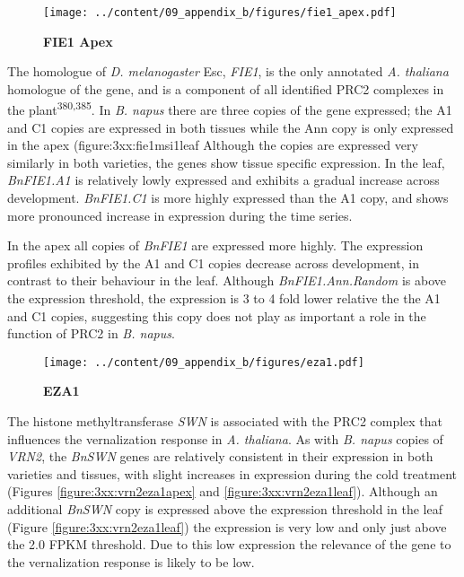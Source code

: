 \documentclass[12pt,]{book}
\begin{document}
\begin{figure}[htbp]
\centering
\texttt{[image: ../content/09\_appendix\_b/figures/fie1\_apex.pdf]}
\caption{\textbf{FIE1 Apex}}\label{figure:3xx:fie1apex}
\end{figure}

The homologue of \emph{D. melanogaster} Esc, \emph{FIE1}, is the only
annotated \emph{A. thaliana} homologue of the gene, and is a component
of all identified PRC2 complexes in the plant\textsuperscript{380,385}.
In \emph{B. napus} there are three copies of the gene expressed; the A1
and C1 copies are expressed in both tissues while the Ann copy is only
expressed in the apex (figure:3xx:fie1msi1leaf Although the copies are
expressed very similarly in both varieties, the genes show tissue
specific expression. In the leaf, \emph{BnFIE1.A1} is relatively lowly
expressed and exhibits a gradual increase across development.
\emph{BnFIE1.C1} is more highly expressed than the A1 copy, and shows
more pronounced increase in expression during the time series.

In the apex all copies of \emph{BnFIE1} are expressed more highly. The
expression profiles exhibited by the A1 and C1 copies decrease across
development, in contrast to their behaviour in the leaf. Although
\emph{BnFIE1.Ann.Random} is above the expression threshold, the
expression is 3 to 4 fold lower relative the the A1 and C1 copies,
suggesting this copy does not play as important a role in the function
of PRC2 in \emph{B. napus}.

\begin{figure}[htbp]
\centering
\texttt{[image: ../content/09\_appendix\_b/figures/eza1.pdf]}
\caption{\textbf{EZA1}}\label{figure:3xx:eza1apex}
\end{figure}

The histone methyltransferase \emph{SWN} is associated with the PRC2
complex that influences the vernalization response in \emph{A.
thaliana}. As with \emph{B. napus} copies of \emph{VRN2}, the
\emph{BnSWN} genes are relatively consistent in their expression in both
varieties and tissues, with slight increases in expression during the
cold treatment (Figures \ref{figure:3xx:vrn2eza1apex} and
\ref{figure:3xx:vrn2eza1leaf}). Although an additional \emph{BnSWN} copy
is expressed above the expression threshold in the leaf (Figure
\ref{figure:3xx:vrn2eza1leaf}) the expression is very low and only just
above the 2.0 FPKM threshold. Due to this low expression the relevance
of the gene to the vernalization response is likely to be low.
\end{document}
